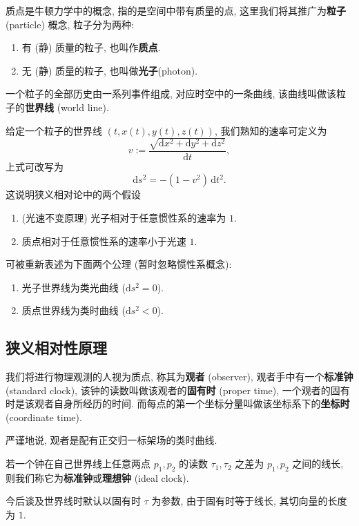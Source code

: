 质点是牛顿力学中的概念, 指的是空间中带有质量的点, 这里我们将其推广为{\bf 粒子} (particle) 概念, 粒子分为两种: 
\begin{enumerate}
    \item 有 (静) 质量的粒子, 也叫作{\bf 质点}.
    \item 无 (静) 质量的粒子, 也叫做{\bf 光子}(photon).
\end{enumerate}
一个粒子的全部历史由一系列事件组成, 对应时空中的一条曲线, 该曲线叫做该粒子的{\bf 世界线} (world line). 

给定一个粒子的世界线 $ (t,x(t),y(t),z(t)) $, 我们熟知的速率可定义为
\[ v:=\frac{\sqrt{\mathrm{d}x^2+\mathrm{d}y^2+\mathrm{d}z^2}}{\mathrm{d}t}, \]
上式可改写为
\[ \mathrm{d}s^2=-(1-v^2)\,\mathrm{d}t^2. \]
这说明狭义相对论中的两个假设
\begin{enumerate}
    \item (光速不变原理) 光子相对于任意惯性系的速率为 $ 1 $.
    \item 质点相对于任意惯性系的速率小于光速 $ 1 $.
\end{enumerate}
可被重新表述为下面两个公理 (暂时忽略惯性系概念):
\begin{enumerate}
    \item 光子世界线为类光曲线 ($ \mathrm{d}s^2=0 $).
    \item 质点世界线为类时曲线 ($ \mathrm{d}s^2<0 $).
\end{enumerate}

\subsection{狭义相对性原理}
我们将进行物理观测的人视为质点, 称其为{\bf 观者} (observer), 观者手中有一个{\bf 标准钟} (standard clock), 该钟的读数叫做该观者的{\bf 固有时} (proper time), 一个观者的固有时是该观者自身所经历的时间. 而每点的第一个坐标分量叫做该坐标系下的{\bf 坐标时} (coordinate time).

\begin{remark}
    严谨地说, 观者是配有正交归一标架场的类时曲线.
\end{remark}

\begin{definition}[标准钟]
    若一个钟在自己世界线上任意两点 $ p_1,p_2 $ 的读数 $ \tau_1,\tau_2 $ 之差为 $ p_1,p_2 $ 之间的线长, 则我们称它为{\bf 标准钟}或{\bf 理想钟} (ideal clock).
\end{definition}

\begin{remark}
    今后谈及世界线时默认以固有时 $ \tau $ 为参数, 由于固有时等于线长, 其切向量的长度为 $ 1 $. 
\end{remark}

